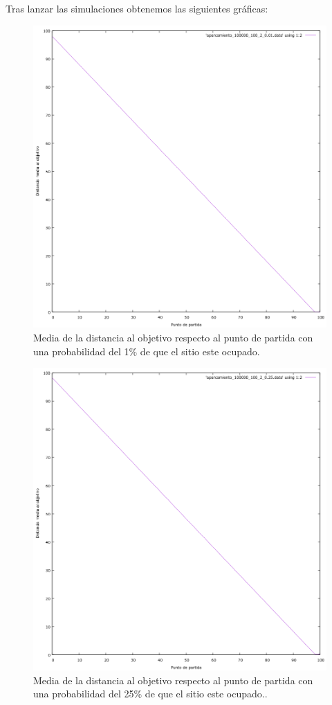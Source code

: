 \documentclass[12pt, spanish]{article}
\begin{document}
Tras lanzar las simulaciones obtenemos las siguientes gráficas:


\begin{figure}[H]
	\centering
	\includegraphics[scale = 0.6]{aparcamiento_100000_100_2_0-01.png}
	\caption{Media de la distancia al objetivo respecto al punto de partida con una probabilidad del 1\% de que el sitio este ocupado.}
	\label{fig:ej4}
\end{figure}

\begin{figure}[H]
	\centering
	\includegraphics[scale = 0.6]{aparcamiento_100000_100_2_0-25.png}
	\caption{Media de la distancia al objetivo respecto al punto de partida con una probabilidad del 25\% de que el sitio este ocupado..}
	\label{fig:ej4}
\end{figure}
\end{document}
